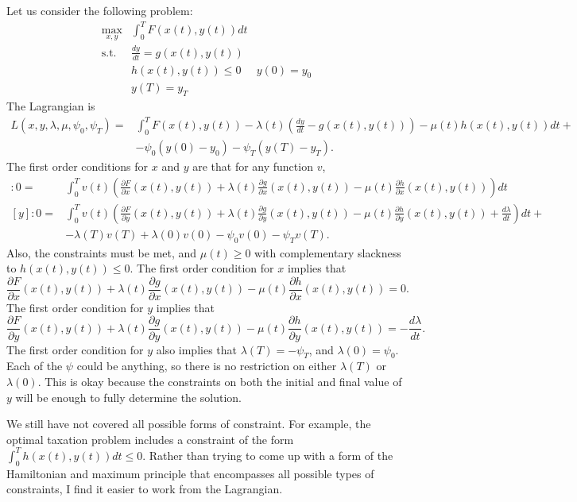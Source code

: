 Let us consider the following problem:
\begin{align*}
  \max_{x,y} & \int_0^T F(x(t),y(t)) dt \\
  \text{s.t.} & \frac{dy}{dt} = g(x(t),y(t)) \\
  & h(x(t),y(t)) \leq 0 
  & y(0) = y_0 \\
  & y(T) = y_T 
\end{align*}
The Lagrangian is  
\begin{align*}
  L(x,y,\lambda, \mu, \psi_0,\psi_T) = & \int_0^T F(x(t),y(t)) -
\lambda(t) (\frac{dy}{dt} - g(x(t),y(t)) ) - \mu(t) h(x(t),y(t)) dt +
\\
& - \psi_0(y(0) - y_0) - \psi_T(y(T) - y_T). 
\end{align*}
The first order conditions for $x$ and $y$ are that for any function
$v$, 
\begin{align*}
  [x]: 0 = & \int_0^T v(t) \left(\frac{\partial F}{\partial
      x}(x(t),y(t)) + \lambda(t) \frac{\partial g}{\partial
      x}(x(t),y(t)) - \mu(t) \frac{\partial h}{\partial x}(x(t),y(t))
  \right) dt \\
  [y]: 0 = & \int_0^T v(t) \left(\frac{\partial F}{\partial
      y}(x(t),y(t)) + \lambda(t) \frac{\partial g}{\partial y}(x(t),y(t))
    - \mu(t) \frac{\partial h}{\partial y}(x(t),y(t)) +
  \frac{d\lambda}{dt} \right)dt + 
  \\ 
   & - \lambda(T)v(T) + \lambda(0)v(0)  - \psi_0v(0) - \psi_T v(T).
\end{align*}
Also, the constraints must be met, and $\mu(t) \geq 0$ with
complementary slackness to $h(x(t),y(t)) \leq 0$. The first order
condition for $x$ implies that
\[ \frac{\partial F}{\partial
  x}(x(t),y(t)) + \lambda(t) \frac{\partial g}{\partial
  x}(x(t),y(t)) - \mu(t) \frac{\partial h}{\partial x}(x(t),y(t))
= 0. \]
The first order condition for $y$ implies that 
\[ \frac{\partial F}{\partial
  y}(x(t),y(t)) + \lambda(t) \frac{\partial g}{\partial y}(x(t),y(t))
- \mu(t) \frac{\partial h}{\partial y}(x(t),y(t)) =
-\frac{d\lambda}{dt}. \]
The first order condition for $y$ also implies that $\lambda(T) =
-\psi_T$, and $\lambda(0) = \psi_0$. Each of the $\psi$ could be
anything, so there is no restriction on either $\lambda(T)$ or
$\lambda(0)$. This is okay because the constraints on both the initial
and final value of $y$ will be enough to fully determine the
solution. 

We still have not covered all possible forms of constraint. For
example, the optimal taxation problem includes a constraint of the
form $\int_0^T h(x(t),y(t)) dt \leq 0$. Rather than trying to come up
with a form of the Hamiltonian and maximum principle that encompasses
all possible types of constraints, I find it easier to work from the
Lagrangian. 

